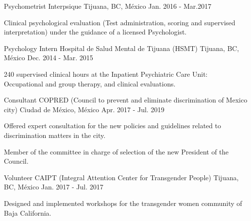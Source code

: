 \vspace{-3mm}
\begin{cventries}
    \cventry
        {Psychometrist}
        {Interpsique}
        {Tijuana, BC, México}
        {Jan. 2016 - Mar.2017}
        {
            \begin{cvitems}
                \item {Clinical psychological evaluation (Test administration,
                    scoring and supervised interpretation) under the guidance
                    of a licensed Psychologist.}
            \end{cvitems}
        }
    \cventry
        {Psychology Intern}
        {Hospital de Salud Mental de Tijuana (HSMT)}
        {Tijuana, BC, México}
        {Dec. 2014 - Mar. 2015}
        {
            \begin{cvitems}
                \item {240 supervised clinical hours at the Inpatient
                    Psychiatric Care Unit:
                    Occupational and group therapy, and clinical evaluations.}
            \end{cvitems}
        }
\end{cventries}
 \begin{cventries}
     \cventry
         {Consultant}
         {COPRED (Council to prevent and eliminate discrimination of Mexico city)}
         {Ciudad de México, México}
         {Apr. 2017 - Jul. 2019}
         {
             \begin{cvitems}
                 \item {Offered expert consultation for the new policies and guidelines
                   related to discrimination matters in the city.}
                 \item {Member of the committee in charge of selection of the
                     new President of the Council.}
             \end{cvitems}
         }
     \cventry
         {Volunteer}
         {CAIPT (Integral Attention Center for Transgender People)}
         {Tijuana, BC, México}
         {Jan. 2017 - Jul. 2017}
         {
             \begin{cvitems}
                 \item {Designed and implemented workshops for the transgender
                   women community of Baja California.}
             \end{cvitems}
         }
 \end{cventries}
